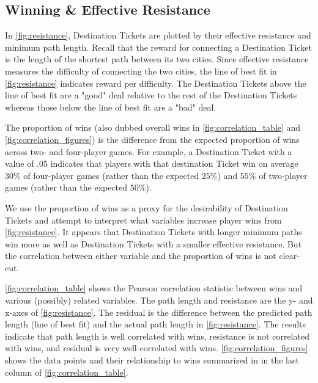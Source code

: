 \begin{multicols}{2}

\subsection{Winning \& Effective Resistance}

In \cref{fig:resistance},
Destination Tickets are plotted by their effective resistance
and minimum path length.
Recall that the reward for connecting a Destination Ticket
is the length of the shortest path between its two cities.
Since effective resistance measures the difficulty of
connecting the two cities, the line of best fit in \cref{fig:resistance}
indicates reward per difficulty.
The Destination Tickets above the line of best fit are
a "good" deal relative to the rest of the Destination Tickets
whereas those below the line of best fit are a "bad" deal.

The proportion of wins (also dubbed overall wins
in \cref{fig:correlation_table} and \cref{fig:correlation_figures})
is the difference from the expected proportion of wins
across two- and four-player games.
For example, a Destination Ticket with a value of .05 indicates
that players with that destination Ticket 
win on average $30\%$ of four-player games
(rather than the expected $25\%$) and $55\%$ of 
two-player games (rather than the expected $50\%$).

We use the proportion of wins as a proxy for the desirability
of Destination Tickets and attempt to interpret what variables
increase player wins from \cref{fig:resistance}.
It appears that Destination Tickets with longer minimum paths win
more as well as Destination Tickets with a smaller effective resistance.
But the correlation between either variable and the proportion
of wins is not clear-cut.

\cref{fig:correlation_table} shows the Pearson correlation statistic
between wins and various (possibly) related variables.
The path length and resistance are the y- and x-axes of 
\cref{fig:resistance}.
The residual is the difference between the predicted
path length (line of best fit) and the actual path length
in \cref{fig:resistance}.
The results indicate that path length is well correlated with wins,
resistance is not correlated with wins, and residual is very
well correlated with wins.
\cref{fig:correlation_figures} shows the data points and
their relationship to wins summarized in
in the last column of \cref{fig:correlation_table}.


\end{multicols}
